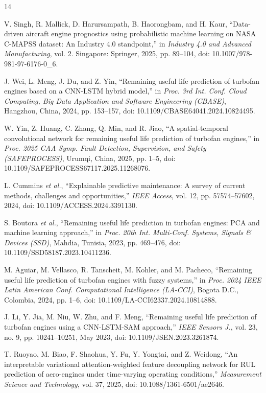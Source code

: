 \documentclass[conference]{IEEEtran}
\begin{document}
\begin{thebibliography}{14}

V. Singh, R. Mallick, D. Harursampath, B. Haorongbam, and H. Kaur, 
``Data-driven aircraft engine prognostics using probabilistic machine learning on NASA C-MAPSS dataset: An Industry 4.0 standpoint,'' 
in \textit{Industry 4.0 and Advanced Manufacturing}, vol. 2. Singapore: Springer, 2025, pp. 89--104, doi: 10.1007/978-981-97-6176-0\_6.


J. Wei, L. Meng, J. Du, and Z. Yin, 
``Remaining useful life prediction of turbofan engines based on a CNN-LSTM hybrid model,'' 
in \textit{Proc. 3rd Int. Conf. Cloud Computing, Big Data Application and Software Engineering (CBASE)}, Hangzhou, China, 2024, pp. 153--157, doi: 10.1109/CBASE64041.2024.10824495.

W. Yin, Z. Huang, C. Zhang, Q. Min, and R. Jiao, 
``A spatial-temporal convolutional network for remaining useful life prediction of turbofan engines,'' 
in \textit{Proc. 2025 CAA Symp. Fault Detection, Supervision, and Safety (SAFEPROCESS)}, Urumqi, China, 2025, pp. 1--5, doi: 10.1109/SAFEPROCESS67117.2025.11268076.

L. Cummins \textit{et al.}, 
``Explainable predictive maintenance: A survey of current methods, challenges and opportunities,'' 
\textit{IEEE Access}, vol. 12, pp. 57574--57602, 2024, doi: 10.1109/ACCESS.2024.3391130.


S. Boutora \textit{et al.}, 
``Remaining useful life prediction in turbofan engines: PCA and machine learning approach,'' 
in \textit{Proc. 20th Int. Multi-Conf. Systems, Signals \& Devices (SSD)}, Mahdia, Tunisia, 2023, pp. 469--476, doi: 10.1109/SSD58187.2023.10411236.

M. Aguiar, M. Vellasco, R. Tanscheit, M. Kohler, and M. Pacheco, 
``Remaining useful life prediction of turbofan engines with fuzzy systems,'' 
in \textit{Proc. 2024 IEEE Latin American Conf. Computational Intelligence (LA-CCI)}, Bogota D.C., Colombia, 2024, pp. 1--6, doi: 10.1109/LA-CCI62337.2024.10814888.


J. Li, Y. Jia, M. Niu, W. Zhu, and F. Meng, 
``Remaining useful life prediction of turbofan engines using a CNN-LSTM-SAM approach,'' 
\textit{IEEE Sensors J.}, vol. 23, no. 9, pp. 10241--10251, May 2023, doi: 10.1109/JSEN.2023.3261874.

T. Ruoyao, M. Biao, F. Shaohua, Y. Fu, Y. Yongtai, and Z. Weidong, 
``An interpretable variational attention-weighted feature decoupling network for RUL prediction of aero-engines under time-varying operating conditions,'' 
\textit{Measurement Science and Technology}, vol. 37, 2025, doi: 10.1088/1361-6501/ae2646.


\end{thebibliography}
\end{document}
